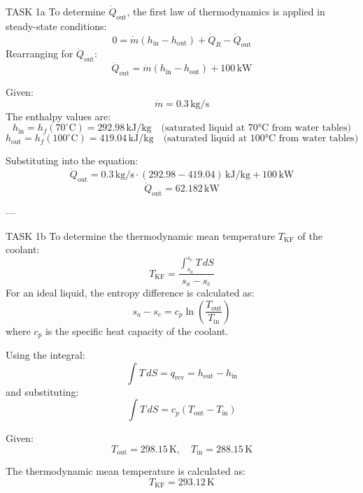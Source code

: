 TASK 1a  
To determine \( \dot{Q}_{\text{out}} \), the first law of thermodynamics is applied in steady-state conditions:  
\[
0 = \dot{m} \left( h_{\text{in}} - h_{\text{out}} \right) + \dot{Q}_R - \dot{Q}_{\text{out}}
\]  
Rearranging for \( \dot{Q}_{\text{out}} \):  
\[
\dot{Q}_{\text{out}} = \dot{m} \left( h_{\text{in}} - h_{\text{out}} \right) + 100 \, \text{kW}
\]  

Given:  
\[
\dot{m} = 0.3 \, \text{kg/s}
\]  
The enthalpy values are:  
\[
h_{\text{in}} = h_f(70^\circ\text{C}) = 292.98 \, \text{kJ/kg} \quad \text{(saturated liquid at 70°C from water tables)}
\]  
\[
h_{\text{out}} = h_f(100^\circ\text{C}) = 419.04 \, \text{kJ/kg} \quad \text{(saturated liquid at 100°C from water tables)}
\]  

Substituting into the equation:  
\[
\dot{Q}_{\text{out}} = 0.3 \, \text{kg/s} \cdot \left( 292.98 - 419.04 \right) \, \text{kJ/kg} + 100 \, \text{kW}
\]  
\[
\dot{Q}_{\text{out}} = 62.182 \, \text{kW}
\]  

---

TASK 1b  
To determine the thermodynamic mean temperature \( T_{\text{KF}} \) of the coolant:  
\[
T_{\text{KF}} = \frac{\int_{s_a}^{s_e} T \, dS}{s_a - s_e}
\]  
For an ideal liquid, the entropy difference is calculated as:  
\[
s_a - s_e = c_p \ln \left( \frac{T_{\text{out}}}{T_{\text{in}}} \right)
\]  
where \( c_p \) is the specific heat capacity of the coolant.  

Using the integral:  
\[
\int T \, dS = q_{\text{rev}} = h_{\text{out}} - h_{\text{in}}
\]  
and substituting:  
\[
\int T \, dS = c_p \left( T_{\text{out}} - T_{\text{in}} \right)
\]  

Given:  
\[
T_{\text{out}} = 298.15 \, \text{K}, \quad T_{\text{in}} = 288.15 \, \text{K}
\]  

The thermodynamic mean temperature is calculated as:  
\[
T_{\text{KF}} = 293.12 \, \text{K}
\]  

